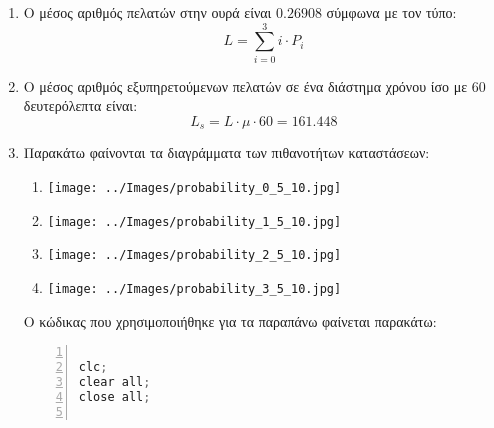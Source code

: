 \documentclass[12pt]{article}
\begin{document}
\begin{enumerate}
    \item{}
        Ο μέσος αριθμός πελατών στην ουρά είναι $0.26908$ σύμφωνα με τον τύπο:
        \begin{equation}
            L = \sum_{i=0}^{3} i \cdot P_i
        \end{equation}

    \item{}
        Ο μέσος αριθμός εξυπηρετούμενων πελατών σε ένα διάστημα χρόνου ίσο με 60 δευτερόλεπτα είναι:
        \begin{equation}
            L_s = L \cdot \mu \cdot 60 = 161.448
        \end{equation}

    \item{}
        Παρακάτω φαίνονται τα διαγράμματα  των πιθανοτήτων καταστάσεων:
        \begin{enumerate}
            \item{}
                \begin{center}
                    \texttt{[image: ../Images/probability\_0\_5\_10.jpg]}
                \end{center}
            \item{}
                \begin{center}
                    \texttt{[image: ../Images/probability\_1\_5\_10.jpg]}
                \end{center}
            \item{}
                \begin{center}
                    \texttt{[image: ../Images/probability\_2\_5\_10.jpg]}
                \end{center}
            \item{}
                \begin{center}
                    \texttt{[image: ../Images/probability\_3\_5\_10.jpg]}
                \end{center}
        \end{enumerate}
Ο κώδικας που χρησιμοποιήθηκε για τα παραπάνω φαίνεται παρακάτω:

\begin{lstlisting}[language=C,
                   frame=single,
                   numberstyle=\color{codegray},
                   basicstyle=\footnotesize,
                   numbers=left,
                   backgroundcolor=\color{lightgray},
                   numbersep=5pt]
% system M/M/1/3

clc;
clear all;
close all;


\end{lstlisting}
\end{enumerate}
\end{document}
